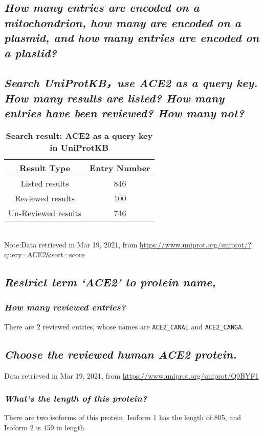 \documentclass[en,black,11pt,normal]{elegantnote}
\begin{document}
\subsection{\textit{How many entries are encoded on a mitochondrion, how many are encoded on a plasmid, and how many entries are encoded on a plastid?}}
\subsection{\textit{Search UniProtKB，use ACE2 as a query key. How many results are listed? How many entries have been reviewed? How many not?}}
\begin{table}[H]
    \caption{\textbf{Search result: ACE2 as a query key in UniProtKB}}
    \centering
    \begin{tabular}{cc}
        \toprule
        Result Type&Entry Number\\
        \midrule
        Listed results&846\\
        Reviewed results&100\\
        Un-Reviewed results&746\\
        \bottomrule
    \end{tabular}
    \\\tiny{Note:Data retrieved in Mar 19, 2021, from \url{https://www.uniprot.org/uniprot/?query=ACE2&sort=score}}
\end{table}


\subsection{\textit{Restrict term ‘ACE2’ to protein name,}}
\subsubsection{\textit{How many reviewed entries?}}
There are 2 reviewed entries, whose names are \texttt{ACE2\_CANAL} and \texttt{ACE2\_CANGA}.
\subsection{\textit{Choose the reviewed human ACE2 protein.}}
Data retrieved in Mar 19, 2021, from \url{https://www.uniprot.org/uniprot/Q9BYF1}
\subsubsection{\textit{What’s the length of this protein?}}
There are two isoforms of this protein, Isoform 1 has the length of 805, and Isoform 2 is 459 in length.
\end{document}
